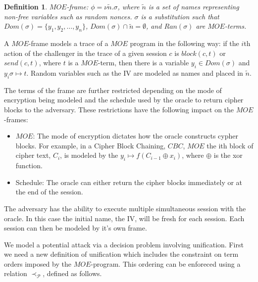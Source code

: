 \documentclass[11pt,twoside,a4paper]{article}
\newtheorem{definition}{Definition}
\begin{document}
\begin{definition}
		$MOE$-frame:  $\phi = \nu \tilde{n}.\sigma$, where
		$\tilde{n}$ is a set of names representing non-free variables such as random nonces. $\sigma$ is a substitution
		such that $Dom(\sigma) = \{ y_1, y_2, \ldots, y_n\}$,
		$Dom(\sigma) \cap \tilde{n} = \emptyset$, and
		$Ran(\sigma)$ are $MOE$-terms.  
\end{definition}

A $MOE$-frame models a trace of a $MOE$ program in the following way:
if the $i$th action of the challenger in the trace of a given session $c$ is 
$block(c, t)$ or $send(c, t)$, where $t$ is a $MOE$-term, 
then there is a variable $y_i \in Dom(\sigma)$ and 
$y_i \sigma \mapsto t$. Random variables such as the IV are 
modeled as names and placed in $\tilde{n}$.

The terms of the frame are further restricted depending on the mode of encryption being modeled and the schedule used by the oracle to
return cipher blocks to the adversary. These restrictions have
the following impact on the $MOE$-frames:
\begin{itemize}
	\item $MOE$: The mode of encryption dictates how the oracle 
	constructs cypher blocks. For example, in a Cipher Block Chaining,
	$CBC$, $MOE$ the ith block of cipher text, $C_i$, is modeled by
	the $y_i \mapsto f(C_{i-1} \oplus x_i)$, where $\oplus$ is
	the xor function.
	\item Schedule: The oracle can either return the 
	cipher blocks immediately or at the end of the session.  
\end{itemize}

The adversary has the ability to execute multiple simultaneous session with the oracle. In this case the initial name, the IV, will be fresh for each session. Each session can then be modeled by it's own frame. 




We model a potential attack via a decision problem involving unification. First we need a new definition of unification which includes the 
constraint on term orders imposed by the $MOE$-program. This 
ordering can be enforeced using a relation $\prec_{\mathcal{P}}$, defined 
as follows. 
\end{document}
